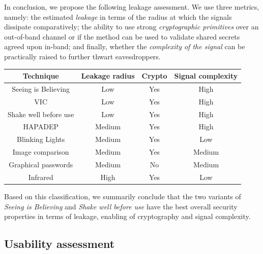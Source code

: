 \documentclass[conference, 11pt]{sty/IEEEtran}
\begin{document}
In conclusion, we propose the following leakage assessment.
We use three metrics, namely: the estimated \emph{leakage} in terms of the radius at which the signals dissipate comparatively; the ability to use strong \emph{cryptographic primitives} over an out-of-band channel or if the method can be used to validate shared secrets agreed upon in-band; and finally, whether the \emph{complexity of the signal} can be practically raised to further thwart eavesdroppers.

\hspace{-2em}
\begin{footnotesize}
\begin{tabular}{c|c|c|c}
	Technique & Leakage radius & Crypto & Signal complexity \\
	\hline
	  Seeing is Believing & Low & Yes & High \\
	  VIC & Low & Yes & High \\
	Shake well before use & Low & Yes & High \\
	 HAPADEP & Medium & Yes & High \\
  Blinking Lights & Medium & Yes & Low \\
	Image comparison & Medium & Yes & Medium\\
    	  Graphical passwords & Medium & No & Medium \\
	Infrared & High & Yes & Low \\
\end{tabular}
\end{footnotesize}
\hspace{2em}

Based on this classification, we summarily conclude that the two variants of \textit{Seeing is Believing} and \textit{Shake well before use} have the best overall security properties in terms of leakage, enabling of cryptography and signal complexity.


\subsection{Usability assessment}
\label{ssec:usability_assessment}
\end{document}

